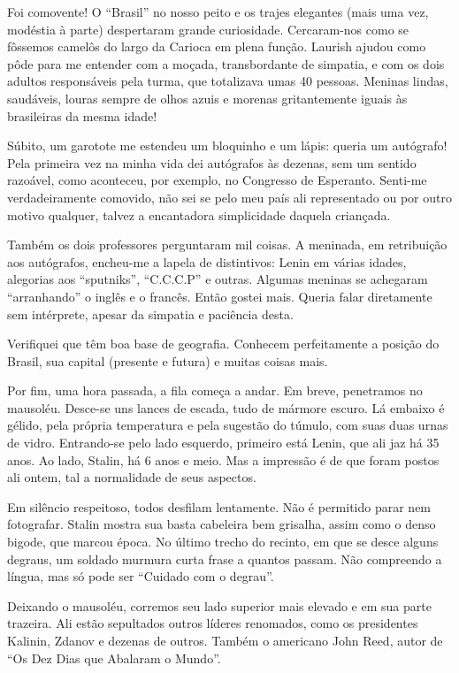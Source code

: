 Foi comovente! O ``Brasil'' no nosso peito e os trajes elegantes (mais uma vez, modéstia à parte) despertaram grande curiosidade. Cercaram-nos como se fôssemos camelôs do largo da Carioca em plena função. Laurish ajudou como pôde para me entender com a moçada, transbordante de simpatia, e com os dois adultos responsáveis pela turma, que totalizava umas 40 pessoas. Meninas lindas, saudáveis, louras sempre de olhos azuis e morenas gritantemente iguais às brasileiras da mesma idade!

Súbito, um garotote me estendeu um bloquinho e um lápis: queria um autógrafo! Pela primeira vez na minha vida dei autógrafos às dezenas, sem um sentido razoável, como aconteceu, por exemplo, no Congresso de Esperanto. Senti-me verdadeiramente comovido, não sei se pelo meu país ali representado ou por outro motivo qualquer, talvez a encantadora simplicidade daquela criançada.

Também os dois professores perguntaram mil coisas. A meninada, em retribuição aos autógrafos, encheu-me a lapela de distintivos: Lenin em várias idades, alegorias aos ``sputniks'', ``C.C.C.P'' e outras. Algumas meninas se achegaram ``arranhando'' o inglês e o francês. Então gostei mais. Queria falar diretamente sem intérprete, apesar da simpatia e paciência desta.

Verifiquei que têm boa base de geografia. Conhecem perfeitamente a posição do Brasil, sua capital (presente e futura) e muitas coisas mais.

Por fim, uma hora passada, a fila começa a andar. Em breve, penetramos no mausoléu. Desce-se uns lances de escada, tudo de mármore escuro. Lá embaixo é gélido, pela própria temperatura e pela sugestão do túmulo, com suas duas urnas de vidro. Entrando-se pelo lado esquerdo, primeiro está Lenin, que ali jaz há 35 anos. Ao lado, Stalin, há 6 anos e meio. Mas a impressão é de que foram postos ali ontem, tal a normalidade de seus aspectos.

Em silêncio respeitoso, todos desfilam lentamente. Não é permitido parar nem fotografar. Stalin mostra sua basta cabeleira bem grisalha, assim como o denso bigode, que marcou época. No último trecho do recinto, em que se desce alguns degraus, um soldado murmura curta frase a quantos passam. Não compreendo a língua, mas só pode ser ``Cuidado com o degrau''.

Deixando o mausoléu, corremos seu lado superior mais elevado e em sua parte trazeira. Ali estão sepultados outros líderes renomados, como os presidentes Kalinin, Zdanov e dezenas de outros. Também o americano John Reed, autor de ``Os Dez Dias que Abalaram o Mundo''.

